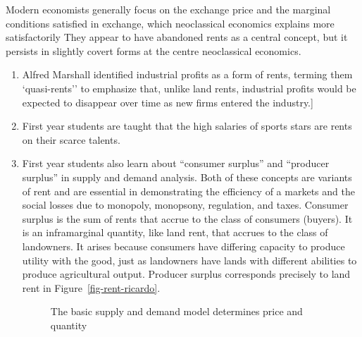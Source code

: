  Modern economists generally focus  on the exchange price and the marginal conditions satisfied in exchange, which neoclassical economics explains more satisfactorily They appear to have abandoned rents as a central concept, but it  persists in slightly covert forms at the centre  neoclassical economics. 
\begin{enumerate}
    \item Alfred Marshall identified industrial profits as a form of rents, terming them `quasi-rents'' to emphasize that, unlike land rents, industrial profits would  be expected to disappear over time as new firms entered the industry.]
    \item First year students are taught that the high salaries of  sports stars are rents on their scarce talents. 
    \item First year students also learn about ``consumer surplus'' and ``producer surplus'' in supply and demand analysis. Both of these concepts are variants of rent and are essential in demonstrating the efficiency of a markets and the social losses due to monopoly, monopsony, regulation, and taxes. Consumer surplus is the sum of rents that accrue to the class of consumers (buyers). It is an inframarginal quantity, like land  rent, that accrues to the class of landowners. It arises because consumers have differing capacity to produce  utility with the good, just as landowners have lands with different abilities to produce agricultural output. Producer surplus corresponds precisely to land rent in Figure~\ref{fig-rent-ricardo}.  

    
 \begin{figure}[h!]
\begin{center}
\caption{The basic supply and demand model determines price and quantity }
\label{fig:Equilibrium}
\end{center}
\end{figure}


\end{enumerate}

